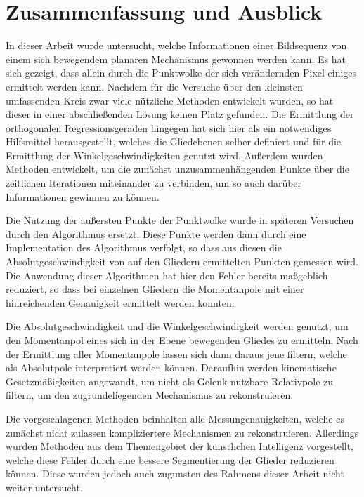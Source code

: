 
\chapter{Zusammenfassung und Ausblick} \label{ch:zusammenfassung_ausblick}


In dieser Arbeit wurde untersucht, welche Informationen einer Bildsequenz von einem sich bewegendem planaren Mechanismus gewonnen werden kann.
Es hat sich gezeigt, dass allein durch die Punktwolke der sich verändernden Pixel einiges ermittelt werden kann.
Nachdem für die Versuche über den kleinsten umfassenden Kreis zwar viele nützliche Methoden entwickelt wurden, so hat dieser in einer abschlie{\ss}enden Lösung keinen Platz gefunden.
Die Ermittlung der orthogonalen Regressionsgeraden hingegen hat sich hier als ein notwendiges Hilfsmittel herausgestellt, welches die Gliedebenen selber definiert und für die Ermittlung der Winkelgeschwindigkeiten genutzt wird.
Au{\ss}erdem wurden Methoden entwickelt, um die zunächst unzusammenhängenden Punkte über die zeitlichen Iterationen miteinander zu verbinden, um so auch darüber Informationen gewinnen zu können.

Die Nutzung der äu{\ss}ersten Punkte der Punktwolke wurde in späteren Versuchen durch den  Algorithmus ersetzt.
Diese Punkte werden dann durch eine Implementation des  Algorithmus verfolgt, so dass aus diesen die Absolutgeschwindigkeit von auf den Gliedern ermittelten Punkten gemessen wird.
Die Anwendung dieser Algorithmen hat hier den Fehler bereits ma{\ss}geblich reduziert, so dass bei einzelnen Gliedern die Momentanpole mit einer hinreichenden Genauigkeit ermittelt werden konnten.

Die Absolutgeschwindigkeit und die Winkelgeschwindigkeit werden genutzt, um den Momentanpol eines sich in der Ebene bewegenden Gliedes zu ermitteln.
Nach der Ermittlung aller Momentanpole lassen sich dann daraus jene filtern, welche als Absolutpole interpretiert werden können.
Daraufhin werden kinematische Gesetzmä{\ss}igkeiten angewandt, um nicht als Gelenk nutzbare Relativpole zu filtern, um den zugrundeliegenden Mechanismus zu rekonstruieren.

Die vorgeschlagenen Methoden beinhalten alle Messungenauigkeiten, welche es zunächst nicht zulassen kompliziertere Mechanismen zu rekonstruieren.
Allerdings wurden Methoden aus dem Themengebiet der künstlichen Intelligenz vorgestellt, welche diese Fehler durch eine bessere Segmentierung der Glieder reduzieren können.
Diese wurden jedoch auch zugunsten des Rahmens dieser Arbeit nicht weiter untersucht.

